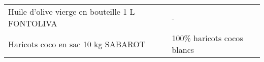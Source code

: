 \begin{longtable}{p{5cm}p{10cm}}
                                                          Huile d'olive vierge en bouteille 1 L FONTOLIVA &                                                                                                                                                                                                                                                                                                                                                                                                                                                                                                                                                                                                                                                                                                                                                                                                                                                                                                                                                                                                                                        - \\
                                                                       Haricots coco en sac 10 kg SABAROT &                                                                                                                                                                                                                                                                                                                                                                                                                                                                                                                                                                                                                                                                                                                                                                                                                                                                                                                                                                                                               100\% haricots cocos blancs \\

\end{longtable}
